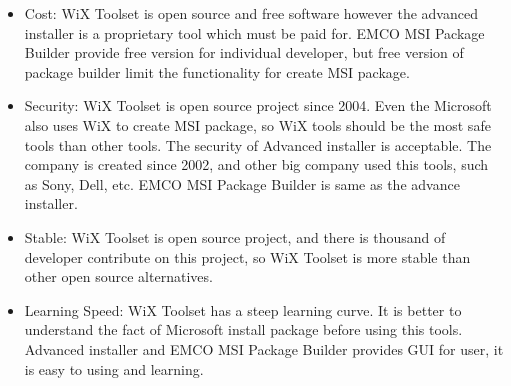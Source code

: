 \begin{itemize}
  \item {
    Cost: WiX Toolset is open source and free software however the advanced installer is a proprietary tool which must be paid for.
    EMCO MSI Package Builder provide free version for individual developer, but free version of package builder limit the functionality for create MSI package.
  }
  \item {
     Security: WiX Toolset is open source project since 2004.
     Even the Microsoft also uses WiX to create MSI package, so WiX tools should be the most safe tools than other tools.
     The security of Advanced installer is acceptable.
     The company is created since 2002, and other big company used this tools, such as Sony, Dell, etc.
     EMCO MSI Package Builder is same as the advance installer.
  }
  \item {
    Stable: WiX Toolset is open source project, and there is thousand of developer contribute on this project, so WiX Toolset is more stable than other open source alternatives.
  }
  \item {
    Learning Speed: WiX Toolset has a steep learning curve.
    It is better to understand the fact of Microsoft install package before using this tools.
    Advanced installer and EMCO MSI Package Builder provides GUI for user, it is easy to using and learning.
  }
\end{itemize}
	
